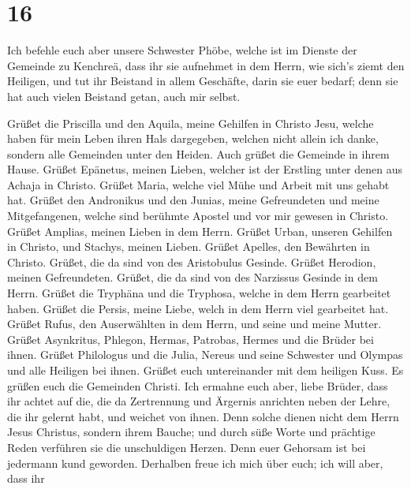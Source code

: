 \hypertarget{section-15}{%
\section{16}\label{section-15}}

 Ich befehle euch aber unsere Schwester Phöbe, welche ist
im Dienste der Gemeinde zu Kenchreä,  dass ihr sie
aufnehmet in dem Herrn, wie sich's ziemt den Heiligen, und tut ihr
Beistand in allem Geschäfte, darin sie euer bedarf; denn sie hat auch
vielen Beistand getan, auch mir selbst.

 Grüßet die Priscilla und den Aquila, meine Gehilfen in
Christo Jesu,  welche haben für mein Leben ihren Hals
dargegeben, welchen nicht allein ich danke, sondern alle Gemeinden unter
den Heiden.  Auch grüßet die Gemeinde in ihrem Hause.
Grüßet Epänetus, meinen Lieben, welcher ist der Erstling unter denen aus
Achaja in Christo.  Grüßet Maria, welche viel Mühe und
Arbeit mit uns gehabt hat.  Grüßet den Andronikus und den
Junias, meine Gefreundeten und meine Mitgefangenen, welche sind berühmte
Apostel und vor mir gewesen in Christo.  Grüßet Amplias,
meinen Lieben in dem Herrn.  Grüßet Urban, unseren
Gehilfen in Christo, und Stachys, meinen Lieben.  Grüßet
Apelles, den Bewährten in Christo. Grüßet, die da sind von des
Aristobulus Gesinde.  Grüßet Herodion, meinen
Gefreundeten. Grüßet, die da sind von des Narzissus Gesinde in dem
Herrn.  Grüßet die Tryphäna und die Tryphosa, welche in
dem Herrn gearbeitet haben. Grüßet die Persis, meine Liebe, welch in dem
Herrn viel gearbeitet hat.  Grüßet Rufus, den
Auserwählten in dem Herrn, und seine und meine Mutter. 
Grüßet Asynkritus, Phlegon, Hermas, Patrobas, Hermes und die Brüder bei
ihnen.  Grüßet Philologus und die Julia, Nereus und seine
Schwester und Olympas und alle Heiligen bei ihnen. 
Grüßet euch untereinander mit dem heiligen Kuss. Es grüßen euch die
Gemeinden Christi.  Ich ermahne euch aber, liebe Brüder,
dass ihr achtet auf die, die da Zertrennung und Ärgernis anrichten neben
der Lehre, die ihr gelernt habt, und weichet von ihnen. 
Denn solche dienen nicht dem Herrn Jesus Christus, sondern ihrem Bauche;
und durch süße Worte und prächtige Reden verführen sie die unschuldigen
Herzen.  Denn euer Gehorsam ist bei jedermann kund
geworden. Derhalben freue ich mich über euch; ich will aber, dass ihr

